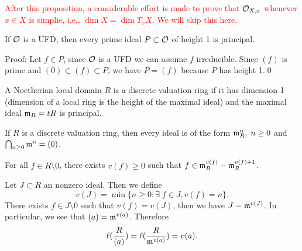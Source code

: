 \begin{center}
    \textcolor{red}{After this proposition, a considerable effort is made to prove that 
    $\mathcal{O}_{X,x}$ whenever $x\in X$ is simplie, i.e., $\dim X=\dim T_xX$. We will skip this here.}
\end{center}

\begin{dang}
    \begin{lemma}
        If $\mathcal{O}$ is a UFD, then every prime ideal $P\subset\mathcal{O}$ of height 1 is principal.
    \end{lemma}
\end{dang}
Proof: Let $f\in P$, since $\mathcal{O}$ is a UFD we can assume $f$ irreducible. Since 
$(f)$ is prime and $(0)\subset (f)\subset P$, we have $P=(f)$ because $P$ has height 1.\qed 


\begin{dang}
    \begin{definition}
        A Noetherian local domain $R$ is a discrete valuation ring if it has dimension 1 (dimension 
        of a local ring is the height of the maximal ideal) and the maximal ideal $\mathfrak{m}_R=tR$ is principal.
    \end{definition}
\end{dang}

\begin{dang}
    \begin{proposition}
        If $R$ is a discrete valuation ring, then every ideal is of the form 
        $\mathfrak{m}_R^n,\;n\geq0$ and $\bigcap_{n\geq0}\mathfrak{m}^n = (0)$.
    \end{proposition}
\end{dang}

\begin{dang}
    \begin{corollary}
        For all $f\in R\setminus0$, there exists $v(f)\geq0$ such that 
        $f\in \mathfrak{m}_R^{v(f)}-\mathfrak{m}_R^{v(f)+1}$.
    \end{corollary}
\end{dang}
Let $J\subset R$ an nonzero ideal. Then we define 
\begin{equation}
    v(J) = \min\{n\geq0:\exists\;f\in J, v(f)=n\}.
\end{equation}
There exists $f\in J\setminus0$ such that $v(f)=v(J)$, then we have $J = \mathfrak{m}^{v(J)}$. In particular, we see that 
$(a) = \mathfrak{m}^{v(a)}$. Therefore 
\begin{equation}
    \ell(\frac{R}{(a)}) = \ell(\frac{R}{\mathfrak{m}^{v(a)}})=v(a).
\end{equation}

